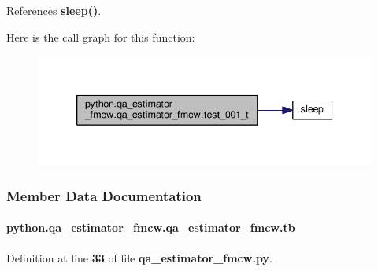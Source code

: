 References {\bf sleep()}.



Here is the call graph for this function\+:
\nopagebreak
\begin{figure}[H]
\begin{center}
\leavevmode
\includegraphics[width=339pt]{dc/d19/classpython_1_1qa__estimator__fmcw_1_1qa__estimator__fmcw_a9bc59760b4df7b9c3abc913b26b55555_cgraph}
\end{center}
\end{figure}




\subsubsection{Member Data Documentation}
\paragraph[{tb}]{\setlength{\rightskip}{0pt plus 5cm}python.\+qa\+\_\+estimator\+\_\+fmcw.\+qa\+\_\+estimator\+\_\+fmcw.\+tb}\label{classpython_1_1qa__estimator__fmcw_1_1qa__estimator__fmcw_a5858c5ad7b4ef4fd2107b69a7d2c944d}


Definition at line {\bf 33} of file {\bf qa\+\_\+estimator\+\_\+fmcw.\+py}.



